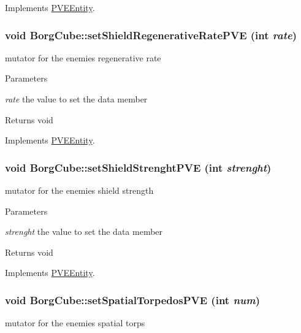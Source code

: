 Implements \hyperlink{classPVEEntity}{PVEEntity}.

\hypertarget{classBorgCube_ac7dd191ef58188f716cce88130225e19}{
\subsubsection[{setShieldRegenerativeRatePVE}]{\setlength{\rightskip}{0pt plus 5cm}void BorgCube::setShieldRegenerativeRatePVE (int {\em rate})}}
\label{d2/d93/classBorgCube_ac7dd191ef58188f716cce88130225e19}
mutator for the enemies regenerative rate


\begin{DoxyParams}{Parameters}
\item[{\em rate}]the value to set the data member\end{DoxyParams}
\begin{DoxyReturn}{Returns}
void 
\end{DoxyReturn}


Implements \hyperlink{classPVEEntity}{PVEEntity}.

\hypertarget{classBorgCube_a4590ecc3b6fa8c5f4051a7d1f58c81a2}{
\subsubsection[{setShieldStrenghtPVE}]{\setlength{\rightskip}{0pt plus 5cm}void BorgCube::setShieldStrenghtPVE (int {\em strenght})}}
\label{d2/d93/classBorgCube_a4590ecc3b6fa8c5f4051a7d1f58c81a2}
mutator for the enemies shield strength


\begin{DoxyParams}{Parameters}
\item[{\em strenght}]the value to set the data member\end{DoxyParams}
\begin{DoxyReturn}{Returns}
void 
\end{DoxyReturn}


Implements \hyperlink{classPVEEntity}{PVEEntity}.

\hypertarget{classBorgCube_a98ae970219c8449220e3fac00456775d}{
\subsubsection[{setSpatialTorpedosPVE}]{\setlength{\rightskip}{0pt plus 5cm}void BorgCube::setSpatialTorpedosPVE (int {\em num})}}
\label{d2/d93/classBorgCube_a98ae970219c8449220e3fac00456775d}
mutator for the enemies spatial torps


